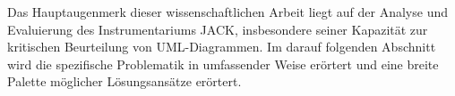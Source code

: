 Das Hauptaugenmerk dieser wissenschaftlichen Arbeit liegt auf der Analyse und Evaluierung des Instrumentariums JACK,
insbesondere seiner Kapazität zur kritischen Beurteilung von UML-Diagrammen. Im darauf folgenden Abschnitt wird die
spezifische Problematik in umfassender Weise erörtert und eine breite Palette möglicher Lösungsansätze erörtert.